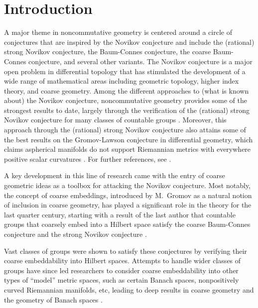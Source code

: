 \documentclass[11pt]{article}
\theoremstyle{definition}
\theoremstyle{plain}
\begin{document}
\section{Introduction}



A major theme in noncommutative geometry is centered around a circle of conjectures that are inspired by the Novikov conjecture and include the (rational) strong Novikov conjecture, the Baum-Connes conjecture, the coarse Baum-Connes conjecture, and several other variants. 
The Novikov conjecture is a major open problem in differential topology that has stimulated the development of a wide range of mathematical areas including geometric topology, higher index theory, and coarse geometry. Among the different approaches to (what is known about) the Novikov conjecture, noncommutative geometry provides some of the strongest results to date, largely through the verification of the (rational) strong Novikov conjecture for many classes of countable groups \cite{Misc1974, Kas88, CM90, CGM93, KS1991, KS2003, HK2001, GHW05, Yu1998, Yu2000, Higson2000, STY2002, mathai03, hankeschick08, MattheyOyono-OyonoPitsch2008Homotopy, FukayaOguni2012, FukayaOguni2015, FukayaOguni2020, GWY2018, GWXY2023}. 
Moreover, 
this approach through the (rational) strong Novikov conjecture also
attains some of the best results on the Gromov-Lawson conjecture in differential geometry, which claims aspherical manifolds do not support Riemannian metrics with everywhere positive scalar curvatures \cite{Rosenberg1983}. 
For further references, see \cite{RosenbergWeinberger1990,  Weinberger1990, FerryWeinberger1991, Valette2002, ChangWeinberger2006, DranishnikovFerryWeinberger2008, MattheyOyono-OyonoPitsch2008Homotopy, KaminkerTang2009, OY2009, RYI2012, RYII2012, CWY2013,WeinbergerXieYu2021, Weinberger2023, GWXY2023, WangXieYuZhu2024}. 


A key development in this line of research came with the entry of coarse geometric ideas as a toolbox for attacking the Novikov conjecture. Most notably, the concept of coarse embeddings, introduced by M.~Gromov \cite{Gromov1993} as a natural notion of inclusion in coarse geometry, has played a significant role in the theory for the last quarter century, starting with a result of the last author that countable groups that coarsely embed into a Hilbert space satisfy the coarse Baum-Connes conjecture and the strong Novikov conjecture \cite{Yu2000,STY2002}. 

Vast classes of groups were shown to satisfy these conjectures by verifying their coarse embeddability into Hilbert spaces. 
Attempts to handle wider classes of groups have since led researchers to consider coarse embeddability into other types of ``model'' metric spaces, such as certain Banach spaces, nonpositively curved Riemannian manifolds, etc, leading to deep results
in coarse geometry and the geometry of Banach spaces \cite{KY2006,KY2012,CWY2015}. 
\end{document}
